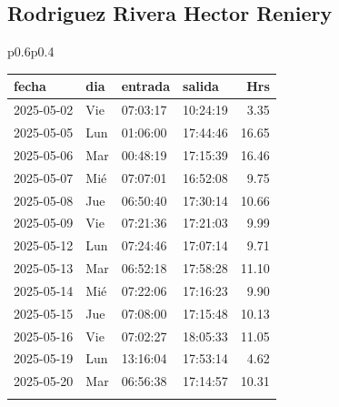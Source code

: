 \documentclass[11pt,a4paper]{article}
\newcommand{\mejoradatabla}[1]{
  \renewcommand{\arraystretch}{1.3}
  \setlength{\tabcolsep}{10pt}
#1
  \renewcommand{\arraystretch}{1}
  \setlength{\tabcolsep}{6pt}
}
\begin{document}
\subsection{ Rodriguez Rivera Hector Reniery }


\begin{tabular}{p{}p{}}
\mejoradatabla{
\begin{tabular}{p{2cm} p{0.6cm} p{1.2cm} p{1.2cm} r}
\toprule
\rowcolor{grisclaro} \textbf{fecha} & \textbf{dia} & \textbf{entrada} & \textbf{salida} & \textbf{Hrs}\\
\midrule

\rowcolor{white}%
2025-05-02 & Vie & 07:03:17 & 10:24:19 &3.35\\
\rowcolor{white}%
2025-05-05 & Lun & 01:06:00 & 17:44:46 &16.65\\
\rowcolor{white}%
2025-05-06 & Mar & 00:48:19 & 17:15:39 &16.46\\
\rowcolor{white}%
2025-05-07 & Mié & 07:07:01 & 16:52:08 &9.75\\
\rowcolor{white}%
2025-05-08 & Jue & 06:50:40 & 17:30:14 &10.66\\
\rowcolor{white}%
2025-05-09 & Vie & 07:21:36 & 17:21:03 &9.99\\
\rowcolor{white}%
2025-05-12 & Lun & 07:24:46 & 17:07:14 &9.71\\
\rowcolor{white}%
2025-05-13 & Mar & 06:52:18 & 17:58:28 &11.10\\
\rowcolor{white}%
2025-05-14 & Mié & 07:22:06 & 17:16:23 &9.90\\
\rowcolor{white}%
2025-05-15 & Jue & 07:08:00 & 17:15:48 &10.13\\
\rowcolor{white}%
2025-05-16 & Vie & 07:02:27 & 18:05:33 &11.05\\
\rowcolor{white}%
2025-05-19 & Lun & 13:16:04 & 17:53:14 &4.62\\
\rowcolor{white}%
2025-05-20 & Mar & 06:56:38 & 17:14:57 &10.31\\
\rowcolor{white}%

\end{tabular}}
\end{tabular}
\end{document}

